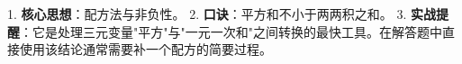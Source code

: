 \begin{summarybox}
1. \textbf{核心思想}：配方法与非负性。
2. \textbf{口诀}：平方和不小于两两积之和。
3. \textbf{实战提醒}：它是处理三元变量"平方"与"一元一次和"之间转换的最快工具。在解答题中直接使用该结论通常需要补一个配方的简要过程。
\end{summarybox}